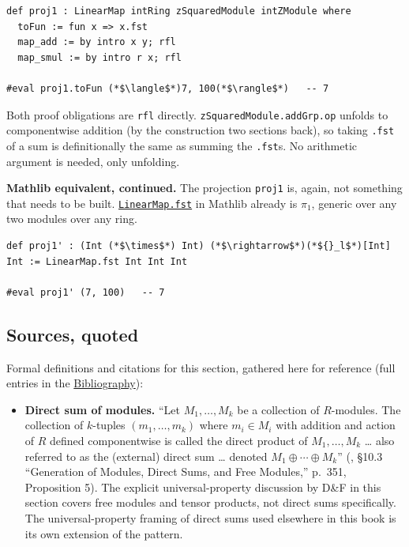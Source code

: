 \begin{lstlisting}
def proj1 : LinearMap intRing zSquaredModule intZModule where
  toFun := fun x => x.fst
  map_add := by intro x y; rfl
  map_smul := by intro r x; rfl

#eval proj1.toFun (*$\langle$*)7, 100(*$\rangle$*)   -- 7
\end{lstlisting}

Both proof obligations are \texttt{rfl} directly. \texttt{zSquaredModule.addGrp.op} unfolds to componentwise addition (by the construction two sections back), so taking \texttt{.fst} of a sum is definitionally the same as summing the \texttt{.fst}s. No arithmetic argument is needed, only unfolding.

\textbf{Mathlib equivalent, continued.} The projection \texttt{proj1} is, again, not something that needs to be built. \href{https://loogle.lean-lang.org/?q=LinearMap.fst}{\texttt{LinearMap.fst}} in Mathlib already is \(\pi_1\), generic over any two modules over any ring.

\begin{lstlisting}
def proj1' : (Int (*$\times$*) Int) (*$\rightarrow$*)(*${}_l$*)[Int] Int := LinearMap.fst Int Int Int

#eval proj1' (7, 100)   -- 7
\end{lstlisting}

\subsection{Sources, quoted}\label{sec:10-modules:06-direct-sums:3}

Formal definitions and citations for this section, gathered here for reference (full entries in the \hyperref[sec:root:bibliography:1]{Bibliography}):

\begin{itemize}
\tightlist
\item
  \textbf{Direct sum of modules.} ``Let \(M_1, \ldots, M_k\) be a collection of \(R\)-modules. The collection of \(k\)-tuples \((m_1, \ldots, m_k)\) where \(m_i \in M_i\) with addition and action of \(R\) defined componentwise is called the direct product of \(M_1, \ldots, M_k\) \ldots{} also referred to as the (external) direct sum \ldots{} denoted \(M_1 \oplus \cdots \oplus M_k\)'' (\cite{DummitFoote2003}, §10.3 ``Generation of Modules, Direct Sums, and Free Modules,'' p.~351, Proposition 5). The explicit universal-property discussion by D\&F in this section covers free modules and tensor products, not direct sums specifically. The universal-property framing of direct sums used elsewhere in this book is its own extension of the pattern.
\end{itemize}
